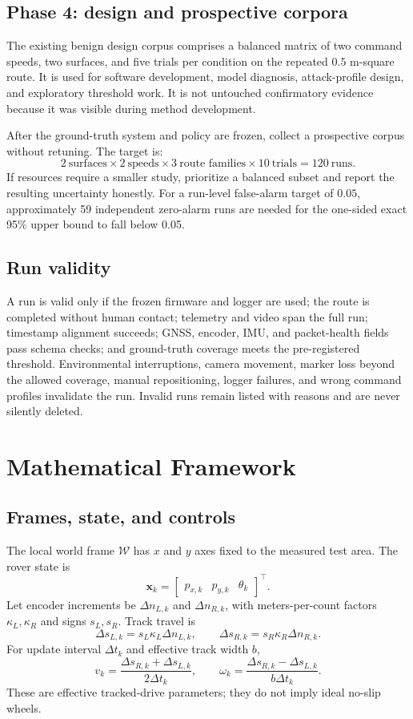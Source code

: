 \documentclass[11pt,a4paper]{article}
\begin{document}
\subsection{Phase 4: design and prospective corpora}

The existing benign design corpus comprises a balanced matrix of two command
speeds, two surfaces, and five trials per condition on the repeated
$0.5$ m-square route. It is used for software development, model diagnosis,
attack-profile design, and exploratory threshold work. It is not untouched
confirmatory evidence because it was visible during method development.

After the ground-truth system and policy are frozen, collect a prospective
corpus without retuning. The target is:
\[
2\ \text{surfaces}\times2\ \text{speeds}\times
3\ \text{route families}\times10\ \text{trials}=120\ \text{runs}.
\]
If resources require a smaller study, prioritize a balanced subset and report
the resulting uncertainty honestly. For a run-level false-alarm target of
$0.05$, approximately 59 independent zero-alarm runs are needed for the
one-sided exact 95\% upper bound to fall below 0.05.

\subsection{Run validity}

A run is valid only if the frozen firmware and logger are used; the route is
completed without human contact; telemetry and video span the full run;
timestamp alignment succeeds; GNSS, encoder, IMU, and packet-health fields pass
schema checks; and ground-truth coverage meets the pre-registered threshold.
Environmental interruptions, camera movement, marker loss beyond the allowed
coverage, manual repositioning, logger failures, and wrong command profiles
invalidate the run. Invalid runs remain listed with reasons and are never
silently deleted.

\section{Mathematical Framework}
\label{sec:math}

\subsection{Frames, state, and controls}

The local world frame $\mathcal W$ has $x$ and $y$ axes fixed to the measured
test area. The rover state is
\[
\mathbf x_k=
\begin{bmatrix}p_{x,k}&p_{y,k}&\theta_k\end{bmatrix}^{\top}.
\]
Let encoder increments be $\Delta n_{L,k}$ and $\Delta n_{R,k}$, with
meters-per-count factors $\kappa_L,\kappa_R$ and signs $s_L,s_R$. Track travel is
\[
\Delta s_{L,k}=s_L\kappa_L\Delta n_{L,k},\qquad
\Delta s_{R,k}=s_R\kappa_R\Delta n_{R,k}.
\]
For update interval $\Delta t_k$ and effective track width $b$,
\[
v_k=\frac{\Delta s_{R,k}+\Delta s_{L,k}}{2\Delta t_k},
\qquad
\omega_k=\frac{\Delta s_{R,k}-\Delta s_{L,k}}{b\Delta t_k}.
\]
These are effective tracked-drive parameters; they do not imply ideal
no-slip wheels.
\end{document}
